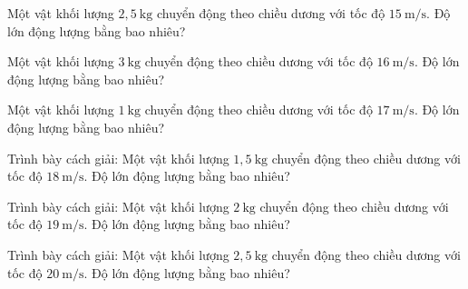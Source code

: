 \begin{ex}
Một vật khối lượng $2,5\ \mathrm{kg}$ chuyển động theo chiều dương với tốc độ $15\ \mathrm{m/s}$. Độ lớn động lượng bằng bao nhiêu?
\end{ex}

\begin{ex}
Một vật khối lượng $3\ \mathrm{kg}$ chuyển động theo chiều dương với tốc độ $16\ \mathrm{m/s}$. Độ lớn động lượng bằng bao nhiêu?
\end{ex}

\begin{ex}
Một vật khối lượng $1\ \mathrm{kg}$ chuyển động theo chiều dương với tốc độ $17\ \mathrm{m/s}$. Độ lớn động lượng bằng bao nhiêu?
\end{ex}

\begin{bt}
Trình bày cách giải: Một vật khối lượng $1,5\ \mathrm{kg}$ chuyển động theo chiều dương với tốc độ $18\ \mathrm{m/s}$. Độ lớn động lượng bằng bao nhiêu?
\end{bt}

\begin{bt}
Trình bày cách giải: Một vật khối lượng $2\ \mathrm{kg}$ chuyển động theo chiều dương với tốc độ $19\ \mathrm{m/s}$. Độ lớn động lượng bằng bao nhiêu?
\end{bt}

\begin{bt}
Trình bày cách giải: Một vật khối lượng $2,5\ \mathrm{kg}$ chuyển động theo chiều dương với tốc độ $20\ \mathrm{m/s}$. Độ lớn động lượng bằng bao nhiêu?
\end{bt}

